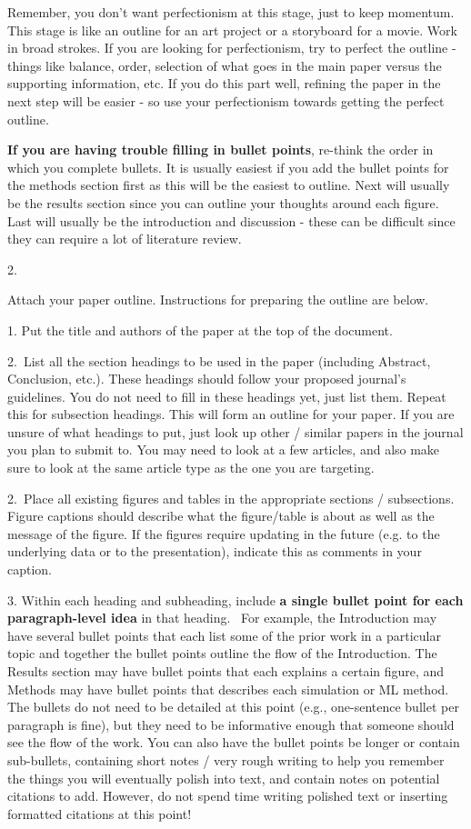\documentclass[]{article}
\begin{document}
Remember, you don't want perfectionism at this stage, just to keep
momentum. This stage is like an outline for an art project or a
storyboard for a movie. Work in broad strokes. If you are looking for
perfectionism, try to perfect the outline - things like balance, order,
selection of what goes in the main paper versus the supporting
information, etc. If you do this part well, refining the paper in the
next step will be easier - so use your perfectionism towards getting the
perfect outline.~

\textbf{If you are having trouble filling in bullet points}, re-think
the order in which you complete bullets. It is usually easiest if you
add the bullet points for the methods section first as this will be the
easiest to outline. Next will usually be the results section since you
can outline your thoughts around each figure. Last will usually be the
introduction and discussion - these can be difficult since they can
require a lot of literature review.

2.

Attach your paper outline. Instructions for preparing the outline are
below.

1. Put the title and authors of the paper at the top of the document.

2.~List all the section headings to be used in the paper (including
Abstract, Conclusion, etc.). These headings should follow your proposed
journal's guidelines. You do not need to fill in these headings yet,
just list them. Repeat this for subsection headings. This will form an
outline for your paper. If you are unsure of what headings to put, just
look up other / similar papers in the journal you plan to submit to. You
may need to look at a few articles, and also make sure to look at the
same article type as the one you are targeting.

2.~Place all existing figures and tables in the appropriate sections /
subsections. Figure captions should describe what the figure/table is
about as well as the message of the figure. If the figures require
updating in the future (e.g. to the underlying data or to the
presentation), indicate this as comments in your caption.

3. Within each heading and subheading, include \textbf{a single bullet
point for each paragraph-level idea} in that heading. ~For example, the
Introduction may have several bullet points that each list some of the
prior work in a particular topic and together the bullet points outline
the flow of the Introduction. The Results section may have bullet points
that each explains a certain figure, and Methods may have bullet points
that describes each simulation or ML method. The bullets do not need to
be detailed at this point (e.g., one-sentence bullet per paragraph is
fine), but they need to be informative enough that someone should see
the flow of the work. You can also have the bullet points be longer or
contain sub-bullets, containing short notes / very rough writing to help
you remember the things you will eventually polish into text, and
contain notes on potential citations to add. However, do not spend time
writing polished text or inserting formatted citations at this point!
\end{document}
